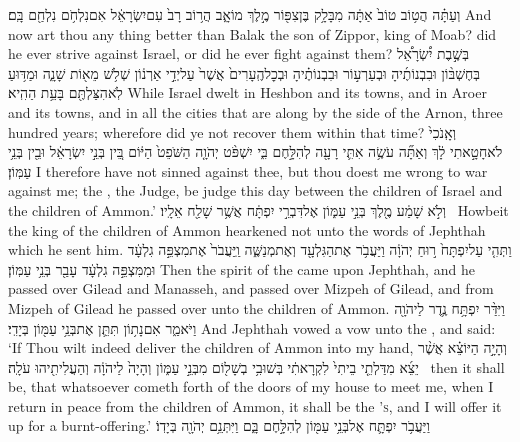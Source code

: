 {וְעַתָּ֗ה הֲט֥וֹב טוֹב֙ אַתָּ֔ה מִבָּלָ֥ק בֶּן\maqqaf צִפּ֖וֹר מֶ֣לֶךְ מוֹאָ֑ב הֲר֥וֹב רָב֙ עִם\maqqaf יִשְׂרָאֵ֔ל אִם\maqqaf נִלְחֹ֥ם נִלְחַ֖ם בָּֽם׃}
{And now art thou any thing better than Balak the son of Zippor, king of Moab? did he ever strive against Israel, or did he ever fight against them?}
{בְּשֶׁ֣בֶת יִ֠שְׂרָאֵ֠ל בְּחֶשְׁבּ֨וֹן וּבִבְנוֹתֶ֜יהָ וּבְעַרְע֣וֹר וּבִבְנוֹתֶ֗יהָ וּבְכׇל\maqqaf הֶֽעָרִים֙ אֲשֶׁר֙ עַל\maqqaf יְדֵ֣י אַרְנ֔וֹן שְׁלֹ֥שׁ מֵא֖וֹת שָׁנָ֑ה וּמַדּ֥וּעַ לֹֽא\maqqaf הִצַּלְתֶּ֖ם בָּעֵ֥ת הַהִֽיא׃}
{While Israel dwelt in Heshbon and its towns, and in Aroer and its towns, and in all the cities that are along by the side of the Arnon, three hundred years; wherefore did ye not recover them within that time?}
{וְאָֽנֹכִי֙ לֹא\maqqaf חָטָ֣אתִי לָ֔ךְ וְאַתָּ֞ה עֹשֶׂ֥ה אִתִּ֛י רָעָ֖ה לְהִלָּ֣חֶם בִּ֑י יִשְׁפֹּ֨ט יְהֹוָ֤ה הַשֹּׁפֵט֙ הַיּ֔וֹם בֵּ֚ין בְּנֵ֣י יִשְׂרָאֵ֔ל וּבֵ֖ין בְּנֵ֥י עַמּֽוֹן׃}
{I therefore have not sinned against thee, but thou doest me wrong to war against me; the \lord, the Judge, be judge this day between the children of Israel and the children of Ammon.’}
{וְלֹ֣א שָׁמַ֔ע מֶ֖לֶךְ בְּנֵ֣י עַמּ֑וֹן אֶל\maqqaf דִּבְרֵ֣י יִפְתָּ֔ח אֲשֶׁ֥ר שָׁלַ֖ח אֵלָֽיו׃ \petucha }
{Howbeit the king of the children of Ammon hearkened not unto the words of Jephthah which he sent him.}
{וַתְּהִ֤י עַל\maqqaf יִפְתָּח֙ ר֣וּחַ יְהֹוָ֔ה וַיַּעֲבֹ֥ר אֶת\maqqaf הַגִּלְעָ֖ד וְאֶת\maqqaf מְנַשֶּׁ֑ה וַֽיַּעֲבֹר֙ אֶת\maqqaf מִצְפֵּ֣ה גִלְעָ֔ד וּמִמִּצְפֵּ֣ה גִלְעָ֔ד עָבַ֖ר בְּנֵ֥י עַמּֽוֹן׃}
{Then the spirit of the \lord\space came upon Jephthah, and he passed over Gilead and Manasseh, and passed over Mizpeh of Gilead, and from Mizpeh of Gilead he passed over unto the children of Ammon.}
{וַיִּדַּ֨ר יִפְתָּ֥ח נֶ֛דֶר לַיהֹוָ֖ה וַיֹּאמַ֑ר אִם\maqqaf נָת֥וֹן תִּתֵּ֛ן אֶת\maqqaf בְּנֵ֥י עַמּ֖וֹן בְּיָדִֽי׃}
{And Jephthah vowed a vow unto the \lord, and said: ‘If Thou wilt indeed deliver the children of Ammon into my hand,}
{וְהָיָ֣ה הַיּוֹצֵ֗א אֲשֶׁ֨ר יֵצֵ֜א מִדַּלְתֵ֤י בֵיתִי֙ לִקְרָאתִ֔י בְּשׁוּבִ֥י בְשָׁל֖וֹם מִבְּנֵ֣י עַמּ֑וֹן וְהָיָה֙ לַיהֹוָ֔ה וְהַעֲלִיתִ֖יהוּ עֹלָֽה׃ \petucha }
{then it shall be, that whatsoever cometh forth of the doors of my house to meet me, when I return in peace from the children of Ammon, it shall be the \lord\textsc{’s}, and I will offer it up for a burnt-offering.’}
{וַיַּעֲבֹ֥ר יִפְתָּ֛ח אֶל\maqqaf בְּנֵ֥י עַמּ֖וֹן לְהִלָּ֣חֶם בָּ֑ם וַיִּתְּנֵ֥ם יְהֹוָ֖ה בְּיָדֽוֹ׃}
